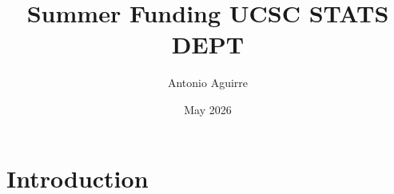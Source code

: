 \documentclass{article}
\title{Summer Funding UCSC STATS DEPT}
\author{Antonio Aguirre}
\date{May 2026}
\begin{document}
\maketitle

\section{Introduction}
\end{document}

